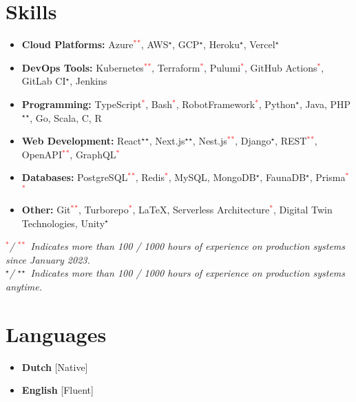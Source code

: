 \documentclass[11pt,a4paper,sans]{moderncv}
\begin{document}
\section{Skills}
{
	\newcommand{\skilled}{\textcolor{black}{$^\star$}}
	\newcommand{\sskilled}{\skilled\skilled}
	\newcommand{\skilledRecent}{\textcolor{red}{$^*$}}
	\newcommand{\sskilledRecent}{\skilledRecent\skilledRecent}
			
	\begin{itemize}[label=\textbullet]
		\item {\textbf{Cloud Platforms:} Azure\sskilledRecent, AWS\skilled, GCP\skilled, Heroku\skilled, Vercel\skilled}
		\item {\textbf{DevOps Tools:} Kubernetes\sskilledRecent, Terraform\skilledRecent, Pulumi\skilledRecent, GitHub Actions\skilledRecent, GitLab CI\skilled, Jenkins}
		\item {\textbf{Programming:} TypeScript\skilledRecent, Bash\skilledRecent, RobotFramework\skilledRecent, Python\skilled, Java, PHP\sskilled, Go, Scala, C, R}
		\item {\textbf{Web Development:} React\sskilled, Next.js\sskilled, Nest.js\sskilledRecent, Django\skilled, REST\sskilledRecent, OpenAPI\sskilledRecent, GraphQL\skilledRecent}
		\item {\textbf{Databases:} PostgreSQL\sskilledRecent, Redis\skilledRecent, MySQL, MongoDB\skilled, FaunaDB\skilled, Prisma\sskilledRecent}
		\item {\textbf{Other:} Git\sskilledRecent, Turborepo\skilledRecent, LaTeX, Serverless Architecture\skilledRecent, Digital Twin Technologies, Unity\skilled}
	\end{itemize}
	{\footnotesize%
		\vspace{-2mm}%
		\emph{%
			\hspace*{4mm}\skilledRecent / \sskilledRecent~Indicates more than 100 / 1000 hours of experience on production systems since January 2023.
			} \\
		\emph{%
			\hspace*{4mm}\skilled / \sskilled~Indicates more than 100 / 1000 hours of experience on production systems anytime.}
	}
			        
}
    

\Needspace{3cm} %
\section{Languages}{
 \begin{multicols}{2}
 	\begin{itemize}[label=\textbullet]
 		\item \textbf{Dutch} [Native]
 		\item \textbf{English} [Fluent]
 	\end{itemize}
 \end{multicols}
}
\end{document}
